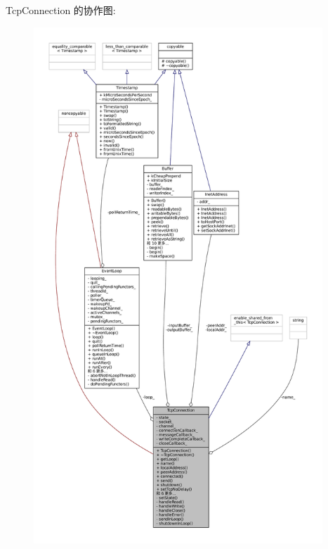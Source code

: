 Tcp\+Connection 的协作图\+:
\nopagebreak
\begin{figure}[H]
\begin{center}
\leavevmode
\includegraphics[height=550pt]{classmuduo_1_1TcpConnection__coll__graph}
\end{center}
\end{figure}

